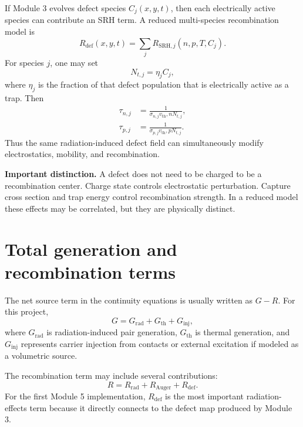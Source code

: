 \documentclass[11pt]{article}
\newcommand{\vt}{v_{\mathrm{th}}}
\begin{document}
If Module 3 evolves defect species \(C_j(x,y,t)\), then each electrically active species can contribute an SRH term. A reduced multi-species recombination model is
\begin{equation}
\boxed{R_{\mathrm{def}}(x,y,t)=\sum_j R_{\mathrm{SRH},j}(n,p,T,C_j).}
\end{equation}
For species \(j\), one may set
\begin{equation}
N_{t,j}=\eta_j C_j,
\end{equation}
where \(\eta_j\) is the fraction of that defect population that is electrically active as a trap. Then
\begin{align}
\tau_{n,j}&=\frac{1}{\sigma_{n,j}\vt,n N_{t,j}}, \\
\tau_{p,j}&=\frac{1}{\sigma_{p,j}\vt,p N_{t,j}}.
\end{align}
Thus the same radiation-induced defect field can simultaneously modify electrostatics, mobility, and recombination.

\begin{physicsbox}
\textbf{Important distinction.} A defect does not need to be charged to be a recombination center. Charge state controls electrostatic perturbation. Capture cross section and trap energy control recombination strength. In a reduced model these effects may be correlated, but they are physically distinct.
\end{physicsbox}

\section{Total generation and recombination terms}

The net source term in the continuity equations is usually written as \(G-R\). For this project,
\begin{equation}
G=G_{\mathrm{rad}}+G_{\mathrm{th}}+G_{\mathrm{inj}},
\end{equation}
where \(G_{\mathrm{rad}}\) is radiation-induced pair generation, \(G_{\mathrm{th}}\) is thermal generation, and \(G_{\mathrm{inj}}\) represents carrier injection from contacts or external excitation if modeled as a volumetric source.

The recombination term may include several contributions:
\begin{equation}
\boxed{R=R_{\mathrm{rad}}+R_{\mathrm{Auger}}+R_{\mathrm{def}}.}
\end{equation}
For the first Module 5 implementation, \(R_{\mathrm{def}}\) is the most important radiation-effects term because it directly connects to the defect map produced by Module 3.
\end{document}
